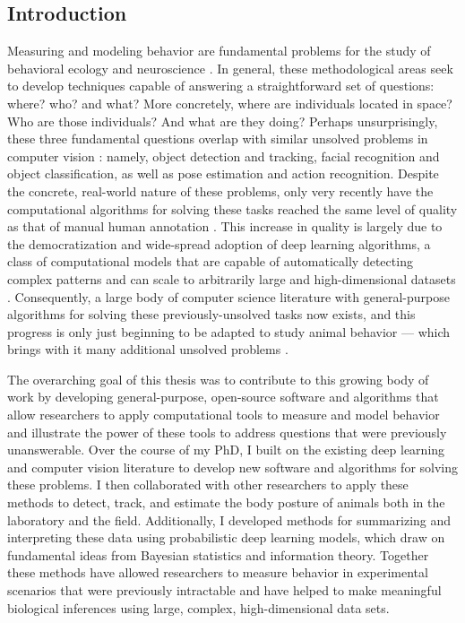 \documentclass[11pt,a4paper,oneside]{book}
\begin{document}
\begin{doublespace}
	\chapter*{Introduction}
Measuring and modeling behavior are fundamental problems for the study of behavioral ecology and neuroscience \citep{berman2018measuring, brown2018ethology}. In general, these methodological areas seek to develop techniques capable of answering a straightforward set of questions: where? who? and what? More concretely, where are individuals located in space? Who are those individuals? And what are they doing? Perhaps unsurprisingly, these three fundamental questions overlap with similar unsolved problems in computer vision \citep{dell2014automated, lecun2015deep}: namely, object detection and tracking, facial recognition and object classification, as well as pose estimation and action recognition. Despite the concrete, real-world nature of these problems, only very recently have the computational algorithms for solving these tasks reached the same level of quality as that of manual human annotation \citep{lecun2015deep, goodfellow2016deep}. This increase in quality is largely due to the democratization and wide-spread adoption of deep learning algorithms, a class of computational models that are capable of automatically detecting complex patterns and can scale to arbitrarily large and high-dimensional datasets \citep{lecun2015deep, goodfellow2016deep}. Consequently, a large body of computer science literature with general-purpose algorithms for solving these previously-unsolved tasks now exists, and this progress is only just beginning to be adapted to study animal behavior \citep{mathis2018deeplabcut, pereira2019fast, graving2019deepposekit, gunel2019deepfly3d} --- which brings with it many additional unsolved problems \citep{graving2019deepposekit, mathis2020deep, mathis2020primer}.

The overarching goal of this thesis was to contribute to this growing body of work by developing general-purpose, open-source software and algorithms that allow researchers to apply computational tools to measure and model behavior and illustrate the power of these tools to address questions that were previously unanswerable. Over the course of my PhD, I built on the existing deep learning and computer vision literature to develop new software and algorithms for solving these problems. I then collaborated with other researchers to apply these methods to detect, track, and estimate the body posture of animals both in the laboratory and the field. Additionally, I developed methods for summarizing and interpreting these data using probabilistic deep learning models, which draw on fundamental ideas from Bayesian statistics and information theory. Together these methods have allowed researchers to measure behavior in experimental scenarios that were previously intractable and have helped to make meaningful biological inferences using large, complex, high-dimensional data sets.


\end{doublespace}
\end{document}

